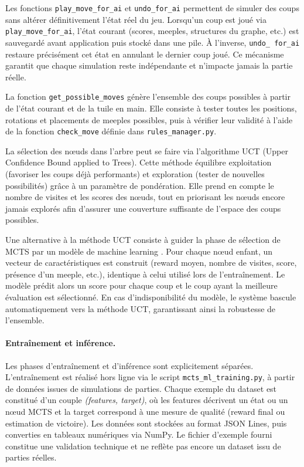 \documentclass[11pt]{article}
\begin{document}
Les fonctions \texttt{play\_move\_for\_ai} et \texttt{undo\_for\_ai} permettent de simuler des coups sans altérer définitivement l'état réel du jeu. Lorsqu'un coup est joué via \texttt{play\_move\_for\_ai}, l'état courant (scores, meeples, structures du graphe, etc.) est sauvegardé avant application puis stocké dans une pile. À l'inverse, \texttt{undo\_ \allowbreak for\_ai} restaure précisément cet état en annulant le dernier coup joué. Ce mécanisme garantit que chaque simulation reste indépendante et n'impacte jamais la partie réelle.

La fonction \texttt{get\_possible\_moves} génère l'ensemble des coups possibles à partir de l'état courant et de la tuile en main. Elle consiste à tester toutes les positions, rotations et placements de meeples possibles, puis à vérifier leur validité à l'aide de la fonction \texttt{check\_move} définie dans \texttt{rules\_manager.py}.

La sélection des nœuds dans l'arbre peut se faire via l'algorithme UCT (Upper Confidence Bound applied to Trees)\cite{kocsis2006bandit}. Cette méthode équilibre exploitation (favoriser les coups déjà performants) et exploration (tester de nouvelles possibilités) grâce à un paramètre de pondération. Elle prend en compte le nombre de visites et les scores des nœuds, tout en priorisant les nœuds encore jamais explorés afin d'assurer une couverture suffisante de l'espace des coups possibles.

Une alternative à la méthode UCT consiste à guider la phase de 
sélection de MCTS par un modèle de machine learning \cite{pandey2019machine}. Pour chaque 
nœud enfant, un vecteur de caractéristiques est construit (reward 
moyen, nombre de visites, score, présence d'un meeple, etc.), 
identique à celui utilisé lors de l'entraînement. Le modèle prédit 
alors un score pour chaque coup et le coup ayant la meilleure 
évaluation est sélectionné. En cas d'indisponibilité du modèle, le 
système bascule automatiquement vers la méthode UCT, garantissant 
ainsi la robustesse de l'ensemble.

\paragraph{Entraînement et inférence.}
Les phases d'entraînement et d'inférence sont explicitement séparées. 
L'entraînement est réalisé hors ligne via le script 
\texttt{mcts\_ml\_training.py}, à partir de données issues de 
simulations de parties. Chaque exemple du dataset est constitué d'un 
couple \textit{(features, target)}, où les features décrivent un état 
ou un nœud MCTS et la target correspond à une mesure de qualité 
(reward final ou estimation de victoire). Les données sont stockées 
au format JSON Lines, puis converties en tableaux numériques via 
NumPy. Le fichier d'exemple fourni constitue une validation technique 
et ne reflète pas encore un dataset issu de parties réelles.
\end{document}
